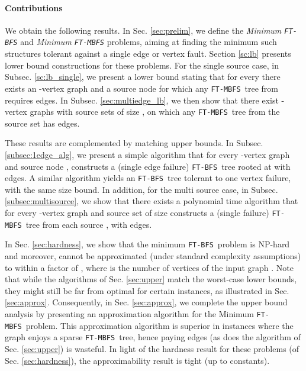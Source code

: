 \documentclass[12pt]{article}
\def\FTMBFS{\mbox{\tt FT-MBFS}}
\def\FTBFS{\mbox{\tt FT-BFS}}
\begin{document}
\paragraph{Contributions}
We obtain the following results.
In Sec. \ref{sec:prelim}, we define the \emph{Minimum \FTBFS} and
\emph{Minimum \FTMBFS} problems, aiming at finding the minimum such
structures tolerant against a single edge or vertex fault.
Section \ref{sc:lb} presents lower bound constructions for these problems.
For the single source case, in Subsec. \ref{sc:lb_single}, we present a lower bound stating that for every  there exists an -vertex
graph and a source node  for which any
\FTMBFS\ tree from  requires  edges.
In Subsec. \ref{sec:multiedge_lb},
we then show that there exist
-vertex graphs with source sets  of size ,
on which any \FTMBFS\ tree from the source set  has
 edges.

These results are complemented by matching upper bounds.
In Subsec. \ref{subsec:1edge_alg}, we present a simple algorithm that for every
-vertex graph  and source node , constructs a (single edge failure)
\FTBFS\ tree rooted at  with  edges.
A similar algorithm yields an \FTBFS\ tree tolerant to one vertex failure,
with the same size bound.
In addition, for the multi source case, in Subsec. \ref{subsec:multisource}, we show that there exists a polynomial
time algorithm that for every -vertex graph and source set 
of size  constructs  a (single failure) \FTMBFS\ tree 
from each source , with  edges.

In Sec. \ref{sec:hardness}, we show that the minimum \FTBFS\ problem is NP-hard and moreover, cannot be approximated
(under standard complexity assumptions) to within a factor of ,
where  is the number of vertices of the input graph .
Note that while the algorithms of Sec. \ref{sec:upper} match the worst-case lower bounds, they might still be far from optimal for certain instances, as illustrated
in Sec. \ref{sec:approx}.  Consequently, in Sec. \ref{sec:approx}, we complete the upper bound analysis by presenting an  approximation algorithm for the Minimum \FTMBFS\ problem.
This approximation algorithm is superior in instances where the graph enjoys
a sparse \FTMBFS\ tree, hence paying  edges
(as does the algorithm of Sec. \ref{sec:upper}) is wasteful.
In light of the hardness result for these problems (of Sec. \ref{sec:hardness}),
the approximability result is tight (up to constants).
\end{document}
